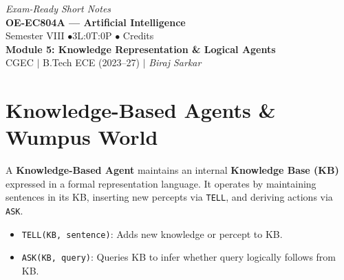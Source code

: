 \documentclass[12pt,a4paper]{article}
\begin{document}
\begin{center}
  \hfill \textit{Exam-Ready Short Notes} \\
  \vspace{6pt}
  {\LARGE\bfseries\color{myred} OE-EC804A --- Artificial Intelligence}\\[5pt]
  {\normalsize\color{mydark} Semester VIII \quad$\bullet$\quad 3L:0T:0P \quad$\bullet$ Credits}\\[3pt]
  {\normalsize\color{myteal}\textbf{Module 5: Knowledge Representation \& Logical Agents}}\\[3pt]
  {\small\color{mydark} CGEC \;$|$\; B.Tech ECE (2023--27) \;$|$\; \textit{Biraj Sarkar}}
\end{center}
\vspace{2pt}
\noindent{\color{myred}\rule{\linewidth}{1.5pt}}
\vspace{2pt}

\hypersetup{linkcolor=mydark}
\tableofcontents
\hypersetup{linkcolor=myteal}
\newpage

\section{Knowledge-Based Agents \& Wumpus World}

\begin{tcolorbox}[defbox, title={Definition of a Knowledge-Based Agent}]
  A \textbf{Knowledge-Based Agent} maintains an internal \textbf{Knowledge Base (KB)} expressed in a formal representation language. It operates by maintaining sentences in its KB, inserting new percepts via \texttt{TELL}, and deriving actions via \texttt{ASK}.
\end{tcolorbox}

\begin{tcolorbox}[formulabox, title={Core Operations of KB Agent}]
  \begin{itemize}[leftmargin=*, noitemsep]
    \item \texttt{TELL(KB, sentence)}: Adds new knowledge or percept to KB.
    \item \texttt{ASK(KB, query)}: Queries KB to infer whether query logically follows from KB.
  \end{itemize}
\end{tcolorbox}
\end{document}
